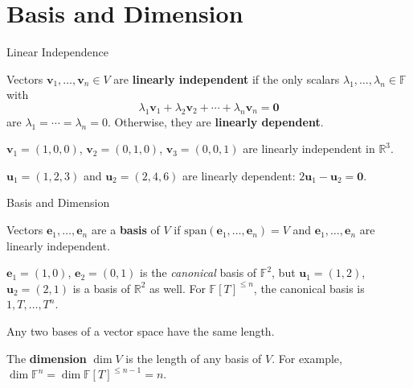 \documentclass{zkdl-presentation-template}
\begin{document}
    \section{Basis and Dimension}

    \begin{frame}{Linear Independence}
        \begin{definition}
            Vectors $\mathbf{v}_1, \dots, \mathbf{v}_n \in V$ are \textbf{linearly independent} if the only scalars $\lambda_1, \dots, \lambda_n \in \mathbb{F}$ with
            \begin{equation*}
                \lambda_1 \mathbf{v}_1 + \lambda_2 \mathbf{v}_2 + \cdots + \lambda_n \mathbf{v}_n = \mathbf{0}
            \end{equation*}
            are $\lambda_1 = \cdots = \lambda_n = 0$. Otherwise, they are \textbf{linearly dependent}.
        \end{definition}
        \pause

        \begin{example}
            $\mathbf{v}_1 = (1, 0, 0)$, $\mathbf{v}_2 = (0, 1, 0)$, $\mathbf{v}_3 = (0, 0, 1)$ are linearly independent in $\mathbb{R}^3$.
        \end{example}
        \pause

        \begin{example}
            $\mathbf{u}_1 = (1, 2, 3)$ and $\mathbf{u}_2 = (2, 4, 6)$ are linearly dependent: $2\mathbf{u}_1 - \mathbf{u}_2 = \mathbf{0}$.
        \end{example}
    \end{frame}

    \begin{frame}{Basis and Dimension}
        \begin{definition}
            Vectors $\mathbf{e}_1,\dots,\mathbf{e}_n$ are a \textbf{basis} of $V$ if $\text{span}(\mathbf{e}_1,\dots,\mathbf{e}_n) = V$ and $\mathbf{e}_1,\dots,\mathbf{e}_n$ are linearly independent.
        \end{definition}
        \pause

        \begin{example}
            $\mathbf{e}_1=(1,0)$, $\mathbf{e}_2=(0,1)$ is the \textit{canonical} basis of $\mathbb{F}^2$, but $\mathbf{u}_1=(1,2)$, $\mathbf{u}_2=(2,1)$ is a basis of $\mathbb{R}^2$ as well. For $\mathbb{F}[T]^{\leq n}$, the canonical basis is $1, T, \dots, T^n$.
        \end{example}
        \pause

        \begin{lemma}
            Any two bases of a vector space have the same length.
        \end{lemma}
        \pause

        \begin{definition}
            The \textbf{dimension} $\dim V$ is the length of any basis of $V$. For example, $\dim \mathbb{F}^n = \dim \mathbb{F}[T]^{\leq n-1} = n$.
        \end{definition}
    \end{frame}
\end{document}
